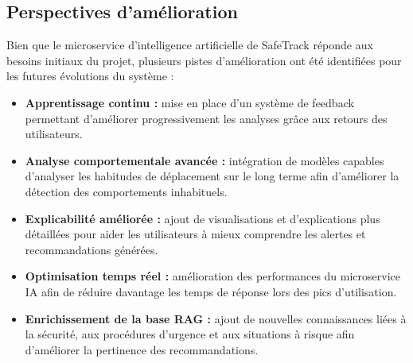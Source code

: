 \subsection{Perspectives d’amélioration}

Bien que le microservice d’intelligence artificielle de SafeTrack réponde aux besoins initiaux du projet, plusieurs pistes d’amélioration ont été identifiées pour les futures évolutions du système :

\begin{itemize}
    \item \textbf{Apprentissage continu :} mise en place d’un système de feedback permettant d’améliorer progressivement les analyses grâce aux retours des utilisateurs.
    
    \item \textbf{Analyse comportementale avancée :} intégration de modèles capables d’analyser les habitudes de déplacement sur le long terme afin d’améliorer la détection des comportements inhabituels.
    
    \item \textbf{Explicabilité améliorée :} ajout de visualisations et d’explications plus détaillées pour aider les utilisateurs à mieux comprendre les alertes et recommandations générées.
    
    \item \textbf{Optimisation temps réel :} amélioration des performances du microservice IA afin de réduire davantage les temps de réponse lors des pics d’utilisation.
    
    \item \textbf{Enrichissement de la base RAG :} ajout de nouvelles connaissances liées à la sécurité, aux procédures d’urgence et aux situations à risque afin d’améliorer la pertinence des recommandations.
\end{itemize}


